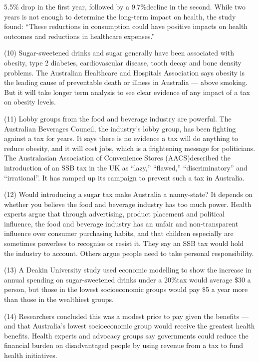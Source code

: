\documentclass[UTF8,11pt]{ctexart}
\begin{document}
5.5\% drop in the first year, followed by a 9.7\%decline in the second. While two years is not enough to determine the long-term impact on health, the study found: “These reductions in consumption could have positive impacts on health outcomes and reductions in healthcare expenses.”


(10) Sugar-sweetened drinks and sugar generally have been associated with obesity, type 2 diabetes, cardiovascular disease, tooth decay and bone density problems. The Australian Healthcare and Hospitals Association says obesity is the leading cause of preventable death or illness in Australia — above smoking. But it will take longer term analysis to see clear evidence of any impact of a tax on obesity levels.


(11) Lobby groups from the food and beverage industry are powerful. The Australian Beverages Council, the industry’s lobby group, has been fighting against a tax for years. It says there is no evidence a tax will do anything to reduce obesity, and it will cost jobs, which is a frightening message for politicians. The Australasian Association of Convenience Stores (AACS)described the introduction of an SSB tax in the UK as “lazy,” “flawed,” “discriminatory” and “irrational”. It has ramped up its campaign to prevent such a tax in Australia.


(12) Would introducing a sugar tax make Australia a nanny-state? It depends on whether you believe the food and beverage industry has too much power. Health experts argue that through advertising, product placement and political influence, the food and beverage industry has an unfair and non-transparent influence over consumer purchasing habits, and that children especially are sometimes powerless to recognise or resist it. They say an SSB tax would hold the industry to account. Others argue people need to take personal responsibility.


(13) A Deakin University study used economic modelling to show the increase in annual spending on sugar-sweetened drinks under a 20\%tax would average \$30 a person, but those in the lowest socioeconomic groups would pay \$5 a year more than those in the wealthiest groups.


(14) Researchers concluded this was a modest price to pay given the benefits — and that Australia’s lowest socioeconomic group would receive the greatest health benefits. Health experts and advocacy groups say governments could reduce the financial burden on disadvantaged people by using revenue from a tax to fund health initiatives.
\end{document}
